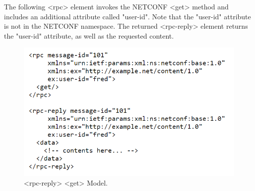The following \textless{rpc}\textgreater{} element invokes the NETCONF \textless{get}\textgreater{} method and
includes an additional attribute called "user-id".  Note that the
"user-id" attribute is not in the NETCONF namespace.  The returned
\textless{rpc-reply}\textgreater{} element returns the "user-id" attribute, as well as the
requested content.

\begin{figure}[h]
    \centering
    \includegraphics[width=0.5\linewidth]{Images/rpc-reply-get.png}
    \caption{\textless{rpc-reply}\textgreater{} \textless{get}\textgreater{} Model.}
    \label{fig:example}
\end{figure}

